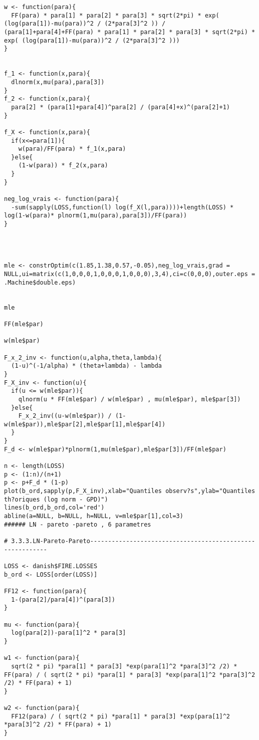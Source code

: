 \begin{verbatim}
w <- function(para){
  FF(para) * para[1] * para[2] * para[3] * sqrt(2*pi) * exp( (log(para[1])-mu(para))^2 / (2*para[3]^2 )) / (para[1]+para[4]+FF(para) * para[1] * para[2] * para[3] * sqrt(2*pi) * exp( (log(para[1])-mu(para))^2 / (2*para[3]^2 )))
}


f_1 <- function(x,para){
  dlnorm(x,mu(para),para[3])
}
f_2 <- function(x,para){
  para[2] * (para[1]+para[4])^para[2] / (para[4]+x)^(para[2]+1)
}

f_X <- function(x,para){
  if(x<=para[1]){
    w(para)/FF(para) * f_1(x,para)
  }else{
    (1-w(para)) * f_2(x,para)
  } 
}

neg_log_vrais <- function(para){
  -sum(sapply(LOSS,function(l) log(f_X(l,para))))+length(LOSS) * log(1-w(para)* plnorm(1,mu(para),para[3])/FF(para))
}




mle <- constrOptim(c(1.85,1.38,0.57,-0.05),neg_log_vrais,grad = NULL,ui=matrix(c(1,0,0,0,1,0,0,0,1,0,0,0),3,4),ci=c(0,0,0),outer.eps = .Machine$double.eps)


mle

FF(mle$par)

w(mle$par)

F_x_2_inv <- function(u,alpha,theta,lambda){
  (1-u)^(-1/alpha) * (theta+lambda) - lambda
}
F_X_inv <- function(u){
  if(u <= w(mle$par)){
    qlnorm(u * FF(mle$par) / w(mle$par) , mu(mle$par), mle$par[3])
  }else{
    F_x_2_inv((u-w(mle$par)) / (1-w(mle$par)),mle$par[2],mle$par[1],mle$par[4])
  }
}
F_d <- w(mle$par)*plnorm(1,mu(mle$par),mle$par[3])/FF(mle$par)

n <- length(LOSS)
p <- (1:n)/(n+1)
p <- p+F_d * (1-p)
plot(b_ord,sapply(p,F_X_inv),xlab="Quantiles observ?s",ylab="Quantiles th?oriques (log norm - GPD)")
lines(b_ord,b_ord,col='red')
abline(a=NULL, b=NULL, h=NULL, v=mle$par[1],col=3)
###### LN - pareto -pareto , 6 parametres

# 3.3.3.LN-Pareto-Pareto----------------------------------------------------------

LOSS <- danish$FIRE.LOSSES
b_ord <- LOSS[order(LOSS)]

FF12 <- function(para){
  1-(para[2]/para[4])^(para[3])
}

mu <- function(para){
  log(para[2])-para[1]^2 * para[3] 
}

w1 <- function(para){
  sqrt(2 * pi) *para[1] * para[3] *exp(para[1]^2 *para[3]^2 /2) * FF(para) / ( sqrt(2 * pi) *para[1] * para[3] *exp(para[1]^2 *para[3]^2 /2) * FF(para) + 1)
}

w2 <- function(para){
  FF12(para) / ( sqrt(2 * pi) *para[1] * para[3] *exp(para[1]^2 *para[3]^2 /2) * FF(para) + 1)
}


\end{verbatim}
